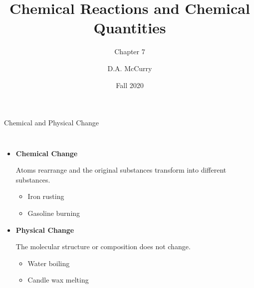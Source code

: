 \documentclass[11pt,letterpaper]{article}
\title{Chemical Reactions and Chemical Quantities}
\subtitle{Chapter 7}
\institute[CHEM115 Bloomsburg University]{CHEM115 --- Chemistry for the Sciences I \\ Bloomsburg University}
\author{D.A. McCurry}
\date{Fall 2020}
\begin{document}
\maketitle
{}

\begin{frame}{Chemical and Physical Change}
	\begin{columns}
		\begin{itemize}[<+->]
			\item \textbf{Chemical Change}\par
			Atoms rearrange and the original
			substances transform into different substances.
			\begin{itemize}[<1->]
				\item Iron rusting
				\item Gasoline burning
			\end{itemize}
		\item \textbf{Physical Change}\par
			The molecular structure or composition does not change.
			\begin{itemize}[<1->]
				\item Water boiling
				\item Candle wax melting
			\end{itemize}
	\end{itemize}
		\centering
	\end{columns}
\end{frame}
\end{document}
